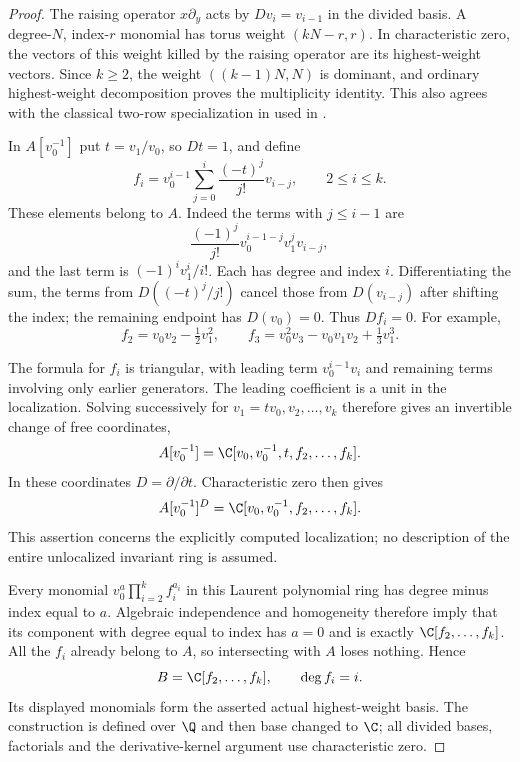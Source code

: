 \begin{proof}
The raising operator $x\partial_y$ acts by $Dv_i=v_{i-1}$ in
the divided basis. A degree-$N$, index-$r$ monomial has torus
weight $(kN-r,r)$. In characteristic zero, the vectors of this
weight killed by the raising operator are its highest-weight
vectors. Since $k\ge2$, the weight $((k-1)N,N)$ is dominant,
and ordinary highest-weight decomposition proves the multiplicity
identity. This also agrees with the classical two-row specialization
in \cite[Lemma~1.3, p.~2]{PPS} used in .

In $A[v_0^{-1}]$ put $t=v_1/v_0$, so $Dt=1$, and define
\[
 f_i=v_0^{i-1}\sum_{j=0}^i\frac{(-t)^j}{j!}v_{i-j},
       \qquad 2\le i\le k.
\]
These elements belong to $A$. Indeed the terms with $j\le i-1$
are
\[
 \frac{(-1)^j}{j!}v_0^{i-1-j}v_1^jv_{i-j},
\]
and the last term is $(-1)^iv_1^i/i!$.
Each has degree and index $i$. Differentiating the sum, the terms
from $D((-t)^j/j!)$ cancel those from $D(v_{i-j})$ after shifting
the index; the remaining endpoint has $D(v_0)=0$.
Thus $Df_i=0$. For example,
\[
 f_2=v_0v_2-\tfrac12v_1^2,\qquad
 f_3=v_0^2v_3-v_0v_1v_2+\tfrac13v_1^3.
\]

The formula for $f_i$ is triangular, with leading term
$v_0^{i-1}v_i$ and remaining terms involving only earlier generators.
The leading coefficient is a unit in the localization. Solving
successively for $v_1=tv_0,v_2,\ldots,v_k$ therefore gives an
invertible change of free coordinates,
\[
 A[v_0^{-1}]=\C[v_0,v_0^{-1},t,f_2,\ldots,f_k].
\]
In these coordinates $D=\partial/\partial t$. Characteristic zero
then gives
\[
 A[v_0^{-1}]^D=\C[v_0,v_0^{-1},f_2,\ldots,f_k].
\]
This assertion concerns the explicitly computed localization; no
description of the entire unlocalized invariant ring is assumed.

Every monomial $v_0^a\prod_{i=2}^k f_i^{a_i}$ in this Laurent
polynomial ring has degree minus index equal to $a$.
Algebraic independence and homogeneity therefore imply that its
component with degree equal to index has $a=0$ and is exactly
$\C[f_2,\ldots,f_k]$. All the $f_i$ already belong to $A$, so
intersecting with $A$ loses nothing. Hence
\begin{equation}\label{eq:actualrayalgebra}
 B=\C[f_2,\ldots,f_k],\qquad \deg f_i=i.
\end{equation}
Its displayed monomials form the asserted actual highest-weight
basis. The construction is defined over $\Q$ and then base changed
to $\C$; all divided bases, factorials and the derivative-kernel
argument use characteristic zero.
\end{proof}

